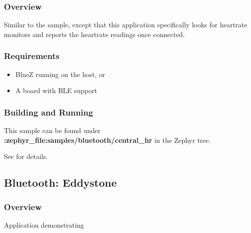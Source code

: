 \documentclass[letterpaper,10pt,english]{sphinxmanual}
\begin{document}
\subsubsection{Overview}
\label{\detokenize{samples/bluetooth/central_hr/README:overview}}
Similar to the  sample, except that this
application specifically looks for heart\sphinxhyphen{}rate monitors and reports the
heart\sphinxhyphen{}rate readings once connected.


\subsubsection{Requirements}
\label{\detokenize{samples/bluetooth/central_hr/README:requirements}}\begin{itemize}
\item {} 
BlueZ running on the host, or

\item {} 
A board with BLE support

\end{itemize}


\subsubsection{Building and Running}
\label{\detokenize{samples/bluetooth/central_hr/README:building-and-running}}
This sample can be found under {\color{red}\bfseries{}:zephyr\_file:\textasciigrave{}samples/bluetooth/central\_hr\textasciigrave{}} in the
Zephyr tree.

See {\hyperref[\detokenize{samples/bluetooth/bluetooth:bluetooth-samples}]{}} for details.


\subsection{Bluetooth: Eddystone}
\label{\detokenize{samples/bluetooth/eddystone/README:bluetooth-eddystone}}\label{\detokenize{samples/bluetooth/eddystone/README:bluetooth-eddystone-sample}}\label{\detokenize{samples/bluetooth/eddystone/README::doc}}

\subsubsection{Overview}
\label{\detokenize{samples/bluetooth/eddystone/README:overview}}
Application demonstrating 
\end{document}
